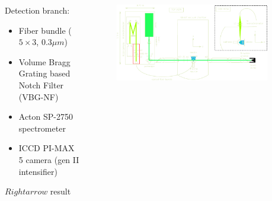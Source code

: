 \documentclass{beamer}
\begin{document}
\begin{frame}{}
\begin{columns}[t]
\begin{column}{.96\paperwidth}
\begin{tcolorbox}[title= \color{beige} \faDotCircleO \ Experimental setup \faDotCircleO,  width=.96\paperwidth, arc=10mm, colback=bleuet, colframe=bleuet]
\begin{columns}
\begin{column}{.4\paperwidth}
     		Detection branch:
     		\begin{itemize}
     			\item Fiber bundle ($5 \times 3$, $0.3 \mu m$)
     			\item Volume Bragg Grating based Notch Filter (VBG-NF)
     			\item Acton SP-2750 spectrometer
     			\item ICCD PI-MAX 5 camera (gen II intensifier)
     		\end{itemize}     		
     		
$Rightarrow$ result     		
     		
     		\end{column} 

     		\begin{column}{.545\paperwidth}
	 	\begin{figure}
	 		\includegraphics[width=0.545\paperwidth]{THETIS_on_NEXET_bright.pdf}
	 	\end{figure}	       
         	\end{column}    
         	

     		\begin{column}{.0075\paperwidth}
     		\end{column}      	      
       \end{columns}
       
 	 \end{tcolorbox}
 	
 	\vspace{.02\paperwidth}

       \begin{tcolorbox}[title= \color{beige} \faDotCircleO \ Results \faDotCircleO, height=.5\paperwidth , width=.96\paperwidth, arc=10mm, colback=bleuet, colframe=bleuet]%
       \vspace{.0075\paperwidth} 
       \color{beige} 
       \small
       

\end{tcolorbox}
\end{column}
\end{columns}
\end{frame}
\end{document}
